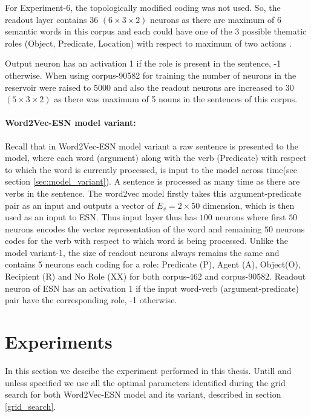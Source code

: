 For Experiment-6, the topologically modified coding was not used. So, the readout layer contains 36 $(6 \times 3 \times 2)$ neurons as there are maximum of 6 semantic words in this corpus and each could have one of the 3 possible thematic roles (Object, Predicate, Location) with respect to maximum of two actions \cite{tra:xavier_hri}. 

Output neuron has an activation 1 if the role is present in the sentence, -1 otherwise. When using corpus-90582 for training the number of neurons in the reservoir were raised to 5000 and also the  readout neurons are increased to 30 $(5 \times 3 \times 2)$ as there was maximum of 5 nouns in the sentences of this corpus. 

\paragraph{Word2Vec-ESN model variant:}

Recall that in Word2Vec-ESN model variant a raw sentence is presented to the model, where each word (argument) along with the verb (Predicate) with respect to which the word is currently processed, is input to the model across time(see section \ref{sec:model_variant}). A sentence is processed as many time as there are verbs in the sentence. The word2vec model firstly takes this argument-predicate pair as an input and outputs a vector of $E_{v} = 2 \times 50$ dimension, which is then used as an input to ESN. Thus input layer thus has $100$ neurons where first $50$ neurons encodes the vector representation of the word and remaining $50$ neurons codes for the verb with respect to which word is being processed. Unlike the model variant-1, the size of readout neurons always remains the same and contains 5 neurons each coding for a role: Predicate (P), Agent (A), Object(O), Recipient (R) and No Role (XX) for both corpus-462 and corpus-90582. Readout neuron of ESN has an activation 1 if the input word-verb (argument-predicate) pair have the corresponding role, -1 otherwise.   

\section{Experiments}

In this section we descibe the experiment performed in this thesis. Untill and unless specified we use all the optimal parameters identified during the grid search for both Word2Vec-ESN model and its variant, described in section \ref{grid_search}. 

